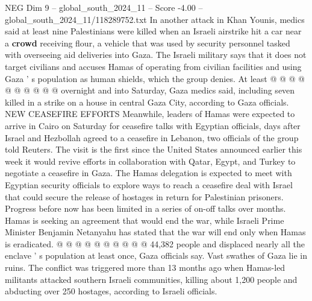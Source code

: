 \begin{textsample}{NEG Dim 9 – global\_south\_2024\_11 – Score -4.00 – global\_south\_2024\_11/118289752.txt}
In another attack in Khan Younis, medics said at least nine Palestinians were killed when an Israeli airstrike hit a car near a \textbf{crowd} receiving flour, a vehicle that was used by security personnel tasked with overseeing aid deliveries into Gaza.
The Israeli military says that it does not target civilians and accuses Hamas of operating from civilian facilities and using Gaza ' s population as human shields, which the group denies.
At least @ @ @ @ @ @ @ @ @ @ overnight and into Saturday, Gaza medics said, including seven killed in a strike on a house in central Gaza City, according to Gaza officials.
NEW CEASEFIRE EFFORTS Meanwhile, leaders of Hamas were expected to arrive in Cairo on Saturday for ceasefire talks with Egyptian officials, days after Israel and Hezbollah agreed to a ceasefire in Lebanon, two officials of the group told Reuters.
The visit is the first since the United States announced earlier this week it would revive efforts in collaboration with Qatar, Egypt, and Turkey to negotiate a ceasefire in Gaza.
The Hamas delegation is expected to meet with Egyptian security officials to explore ways to reach a ceasefire deal with Israel that could secure the release of hostages in return for Palestinian prisoners.
Progress before now has been limited in a series of on-off talks over months.
Hamas is seeking an agreement that would end the war, while Israeli Prime Minister Benjamin Netanyahu has stated that the war will end only when Hamas is eradicated. @ @ @ @ @ @ @ @ @ @ 44,382 people and displaced nearly all the enclave ' s population at least once, Gaza officials say.
Vast swathes of Gaza lie in ruins.
The conflict was triggered more than 13 months ago when Hamas-led militants attacked southern Israeli communities, killing about 1,200 people and abducting over 250 hostages, according to Israeli officials.

\end{textsample}
